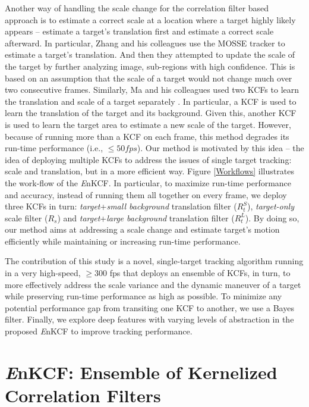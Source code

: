 \documentclass[10pt,twocolumn,letterpaper]{article}
\begin{document}
Another way of handling the scale change for the correlation filter
based approach is to estimate a correct scale at a location where a
target highly likely appears \cite{zhang2014fast} -- estimate a
target's translation first and estimate a correct scale afterward. In
particular, Zhang and his colleagues use the MOSSE tracker to estimate
a target's translation. And then they attempted to update the scale of
the target by further analyzing image, sub-regions with high
confidence. This is based on an assumption that the scale of a target
would not change much over two consecutive frames. Similarly, Ma and
his colleagues used two KCFs to learn the translation and scale of a
target separately \cite{ma2015long}. In particular, a KCF is used to
learn the translation of the target and its background. Given this,
another KCF is used to learn the target area to estimate a new scale
of the target. However, because of running more than a KCF on each
frame, this method degrades its run-time performance (i.e., $\leq 50
fps$). Our method is motivated by this idea -- the idea of deploying
multiple KCFs to address the issues of single target tracking: scale
and translation, but in a more efficient way. Figure \ref{Workflows}
illustrates the work-flow of the {\it E}nKCF. In particular, to
maximize run-time performance and accuracy, instead of running them
all together on every frame, we deploy three KCFs in turn:
\textit{target}+\textit{small background} translation filter
($R_{t}^{S}$), \textit{target-only} scale filter ($R_{s}$) and
\textit{target}+\textit{large background} translation filter
($R_{t}^{L}$). By doing so, our method aims at addressing a scale
change and estimate target's motion efficiently while maintaining or
increasing run-time performance.

The contribution of this study is a novel, single-target tracking
algorithm running in a very high-speed, $\geq 300$ fps that deploys an
ensemble of KCFs, in turn, to more effectively address the scale
variance and the dynamic maneuver of a target while preserving
run-time performance as high as possible. To minimize any potential
performance gap from transiting one KCF to another, we use a Bayes
filter. Finally, we explore deep features with varying levels of abstraction
in the proposed {\it E}nKCF to improve tracking performance.


\section{{\it E}nKCF: Ensemble of Kernelized Correlation Filters}
\end{document}
